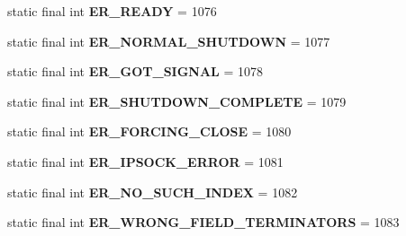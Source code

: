 \begin{DoxyCompactItemize}
static final int {\bfseries E\+R\+\_\+\+R\+E\+A\+DY} = 1076
\item 
\mbox{\label{classcom_1_1mysql_1_1jdbc_1_1_mysql_error_numbers_ae042b31a9f2e673269548116e66904f6}} 
static final int {\bfseries E\+R\+\_\+\+N\+O\+R\+M\+A\+L\+\_\+\+S\+H\+U\+T\+D\+O\+WN} = 1077
\item 
\mbox{\label{classcom_1_1mysql_1_1jdbc_1_1_mysql_error_numbers_aadcbeb7e01f28a7b5b4e4e41928795cc}} 
static final int {\bfseries E\+R\+\_\+\+G\+O\+T\+\_\+\+S\+I\+G\+N\+AL} = 1078
\item 
\mbox{\label{classcom_1_1mysql_1_1jdbc_1_1_mysql_error_numbers_abda30930cf67e0bdf14a05d00950a56c}} 
static final int {\bfseries E\+R\+\_\+\+S\+H\+U\+T\+D\+O\+W\+N\+\_\+\+C\+O\+M\+P\+L\+E\+TE} = 1079
\item 
\mbox{\label{classcom_1_1mysql_1_1jdbc_1_1_mysql_error_numbers_a22ae5f2af5e1759c5a295c802ebaa380}} 
static final int {\bfseries E\+R\+\_\+\+F\+O\+R\+C\+I\+N\+G\+\_\+\+C\+L\+O\+SE} = 1080
\item 
\mbox{\label{classcom_1_1mysql_1_1jdbc_1_1_mysql_error_numbers_ae939152bd1147f5386b59fb3779d5c78}} 
static final int {\bfseries E\+R\+\_\+\+I\+P\+S\+O\+C\+K\+\_\+\+E\+R\+R\+OR} = 1081
\item 
\mbox{\label{classcom_1_1mysql_1_1jdbc_1_1_mysql_error_numbers_ac153da61cdada5ae2dbb4e5cf2bd593b}} 
static final int {\bfseries E\+R\+\_\+\+N\+O\+\_\+\+S\+U\+C\+H\+\_\+\+I\+N\+D\+EX} = 1082
\item 
\mbox{\label{classcom_1_1mysql_1_1jdbc_1_1_mysql_error_numbers_a3f4b222ebffbec4b7c89f86a5d464f4d}} 
static final int {\bfseries E\+R\+\_\+\+W\+R\+O\+N\+G\+\_\+\+F\+I\+E\+L\+D\+\_\+\+T\+E\+R\+M\+I\+N\+A\+T\+O\+RS} = 1083
\item 
\mbox{\label{classcom_1_1mysql_1_1jdbc_1_1_mysql_error_numbers_a41cf717569988cba35b61af23f4cf5c4}} 

\end{DoxyCompactItemize}
